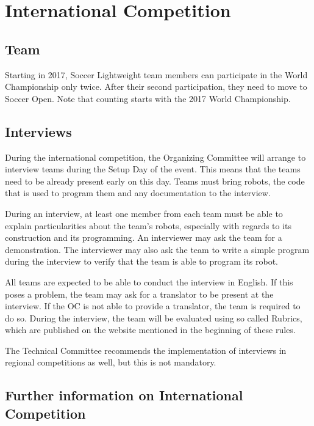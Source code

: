 \documentclass{article}
\begin{document}
\section{International Competition}

\subsection{Team}


Starting in 2017, Soccer Lightweight team members can participate in the World
Championship only twice. After their second participation, they need to move to
Soccer Open. Note that counting starts with the 2017 World Championship.

\subsection{Interviews \label{ref-060}}

During the international competition, the Organizing Committee will arrange to
interview teams during the Setup Day of the event. This means that the teams
need to be already present early on this day. Teams must bring robots, the code
that is used to program them and any documentation to the interview.

During an interview, at least one member from each team must be able to explain
particularities about the team's robots, especially with regards to its
construction and its programming. An interviewer may ask the team for a
demonstration. The interviewer may also ask the team to write a simple program
during the interview to verify that the team is able to program its robot.

All teams are expected to be able to conduct the interview in English. If this
poses a problem, the team may ask for a translator to be present at the
interview. If the OC is not able to provide a translator, the team is required
to do so. During the interview, the team will be evaluated using so called
Rubrics, which are published on the website mentioned in the beginning of these
rules.

The Technical Committee recommends the implementation of interviews in regional
competitions as well, but this is not mandatory.

\subsection{Further information on International Competition \label{ref-061}}
\end{document}
